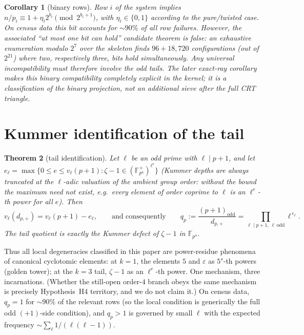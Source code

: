 \documentclass[11pt]{amsart}
\newtheorem{theorem}{Theorem}[section]
\newtheorem{corollary}[theorem]{Corollary}
\theoremstyle{definition}
\theoremstyle{remark}
\newcommand{\F}{\mathbb{F}}
\newcommand{\eps}{\varepsilon}
\begin{document}
\begin{corollary}[binary rows]\label{cor:bit}
Row $i$ of the system implies
$n/p_i \equiv 1 + \eta_i 2^{b_i} \pmod{2^{b_i+1}}$, with
$\eta_i \in \{0,1\}$ according to the pure/twisted case. On census data
this bit accounts for ${\sim}90\%$ of all row failures. However, the
associated ``at most one bit can hold'' candidate theorem is \emph{false}:
an exhaustive enumeration modulo $2^7$ over the skeleton finds $96 + 18{,}720$
configurations (out of $2^{21}$) where two, respectively three, bits hold
simultaneously. Any universal incompatibility must therefore involve the
odd tails.  The later exact-ray corollary makes this binary compatibility
completely explicit in the kernel; it is a classification of the binary
projection, not an additional sieve after the full CRT triangle.
\end{corollary}

\section{Kummer identification of the tail}\label{sec:kummer}

\begin{theorem}[tail identification]\label{thm:tail}
Let $\ell$ be an odd prime with $\ell \mid p + 1$, and let
$e_\ell = \max\{0 \le e \le v_\ell(p+1) : \zeta - 1 \in
(\F_{p^4}^\times)^{\ell^e}\}$ (Kummer depths are always truncated at the
$\ell$-adic valuation of the ambient group order: without the bound the
maximum need not exist, e.g.\ every element of order coprime to $\ell$ is
an $\ell^e$-th power for all $e$). Then
\[
v_\ell(d_{p,+}) = v_\ell(p+1) - e_\ell,
\qquad\text{and consequently}\qquad
q_p := \frac{(p+1)_{\mathrm{odd}}}{d_{p,+}} = \prod_{\ell \mid p+1,\ \ell\
\mathrm{odd}} \ell^{\,e_\ell}.
\]
The tail quotient is exactly the Kummer defect of $\zeta - 1$ in
$\F_{p^4}$.
\end{theorem}

Thus all local degeneracies classified in this paper are power-residue
phenomena of canonical cyclotomic elements: at $k=1$, the elements $5$ and
$\eps$ as $5^s$-th powers (golden tower); at the $k=3$ tail, $\zeta - 1$ as
an $\ell^{e}$-th power. One mechanism, three incarnations. (Whether the
still-open order-$4$ branch obeys the same mechanism is precisely
Hypothesis~H4 territory, and we do not claim it.) On census data,
$q_p = 1$ for ${\sim}90\%$ of the relevant rows (so the local condition is
generically the full odd $(+1)$-side condition), and $q_p > 1$ is governed
by small $\ell$ with the expected frequency
${\sim}\sum_\ell 1/(\ell(\ell-1))$.
\end{document}
